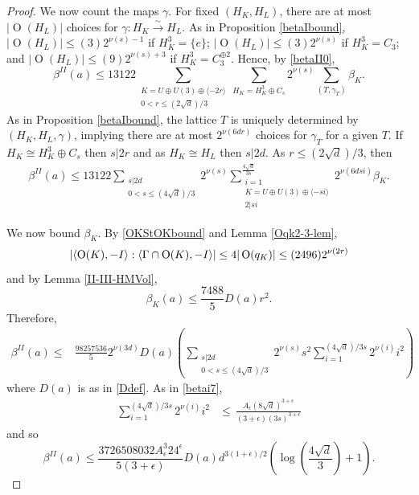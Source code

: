 \documentclass[12pt, a4paper]{article}
\newcommand{\la}{\langle}
\newcommand{\ra}{\rangle}
\newcommand{\opn}{\operatorname}
\newcommand{\op}{\oplus}
\begin{document}
\begin{proof}
We now count the maps $\gamma$.
  For fixed $(H_K, H_L)$, there are at most $\vert \opn{O}(H_L) \vert$ choices for $\gamma: H_K \xrightarrow{\sim} H_L$. 
  As in Proposition \ref{betaIbound},
  $\vert \opn{O}(H_L) \vert \leq (3)2^{\nu(s)-1}$ if $H_K^3=\{e \}$;
  $\vert \opn{O}(H_L) \vert \leq (3)2^{\nu(s)}$ if $H_K^3 = C_3$;
  and $\vert \opn{O}(H_L) \vert \leq (9)2^{\nu(s) + 3}$ if $H_K^3 = C_3^{\op 2}$.
Hence, by \eqref{betaII0}, 
  \[
    \beta^{II}(a)
\leq
      13122
      \sum_{\substack{K=U \op U(3) \op \la -2r \ra \\ 0 < r \leq (2\sqrt{d})/3}}
      \sum_{H_K=H_K^3 \op C_s} 2^{\nu(s)}
      \sum_{(T, \gamma_T)} \beta_K. 
  \]
  As in Proposition \ref{betaIbound}, the lattice $T$ is uniquely determined by $(H_K, H_L, \gamma)$, implying there are at most $2^{\nu(6dr)}$ choices for $\gamma_T$ for a given $T$.
  If $H_K \cong H_K^3 \op C_s$ then $s \vert 2r$ and as  $H_K \cong H_L$ then $s \vert 2d$.
  As $r \leq (2 \sqrt{d})/3$, then   
  \begin{align*}
    \beta^{II}(a) 
    \leq
    13122
    \sum_{\substack{s \vert 2d \\ 0 < s \leq (4\sqrt{d})/3}}2^{\nu(s)}
    \sum_{\substack{i=1 \\ K = U \op U(3) \op \la -si \ra \\ 2 \vert si}}^{\frac{4 \sqrt{d}}{3s}} 2^{\nu(6dsi)} \beta_K.
  \end{align*}


  We now bound $\beta_K$.
  By \eqref{OKStOKbound} and Lemma \ref{Oqk2-3-lem},
  \[
    \vert \la \opn{O}(K), -I \ra : \la \Gamma \cap \opn{O}(K), -I \ra \vert
     \leq 4 \vert \opn{O}(q_K) \vert \\
     \leq (2496)2^{\nu(2r)}
  \]
  and by Lemma \ref{II-III-HMVol},
\begin{equation*}
    \beta_K(a) \leq \frac{7488}{5} D(a) r^2.
  \end{equation*}
  Therefore,  
  \begin{align*}
    \beta^{II}(a)
    \leq & \frac{98257536}{5} 2^{\nu(3d)} D(a) \left( \sum_{\substack{s \vert 2d \\ 0<s \leq (4 \sqrt{d})/3 }}  2^{\nu(s)} s^2  
    \sum_{i=1}^{(4 \sqrt{d})/3s} 2^{\nu(i)} i^2 \right ) 
  \end{align*}
    where $D(a)$ is as in \eqref{Ddef}.
  As in \eqref{betai7}, \begin{align*}\sum_{i=1}^{(4 \sqrt{d})/3s} 2^{\nu(i)} i^2
& \leq \frac{}{} \frac{A_{\epsilon}(8 \sqrt{d})^{3 + \epsilon}}{(3 + \epsilon) (3s)^{3 + \epsilon}}
  \end{align*}
and so 
\[
  \beta^{II}(a) \leq
  \frac{3726508032 A_{\epsilon}^3 24^{\epsilon}}{5 (3 + \epsilon)} D(a) d^{3(1+\epsilon)/2} \left ( \opn{log} \left ( \frac{4 \sqrt{d}}{3} \right ) + 1 \right ).
  \]
\end{proof}
\end{document}
